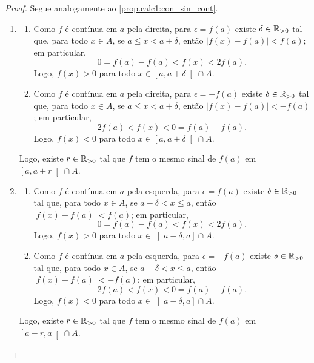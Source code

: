 \begin{proof}
    Segue analogamente ao \cref{prop.calc1:con_sin_cont}.
        \begin{enumerate}[leftmargin=*, align=left, label=\textbf{(\alph*)}]
            \item 
                \begin{enumerate}[label=\roman*.]
                    \item Como $f$ é contínua em $a$ pela direita, para $\epsilon = f(a)$ existe $\delta \in \mathbb{R}_{>0}$ tal que, para todo $x \in A$, se $a \leq x < a+\delta$, então $|f(x) - f(a)| < f(a)$; em particular,
                        \[
                            0 = f(a) - f(a) < f(x) < 2f(a).
                        \]
                    Logo, $f(x) > 0$ para todo $x \in \left[a,a+\delta\right[ \cap A$.
                    \item Como $f$ é contínua em $a$ pela direita, para $\epsilon = -f(a)$ existe $\delta \in \mathbb{R}_{>0}$ tal que, para todo $x \in A$, se $a \leq x < a+\delta$, então $|f(x) - f(a)| < -f(a)$; em particular,
                        \[
                            2f(a) < f(x) < 0 = f(a) - f(a).
                        \]
                    Logo, $f(x) < 0$ para todo $x \in \left[a,a+\delta\right[ \cap A$.
                \end{enumerate}
            Logo, existe $r \in \mathbb{R}_{>0}$ tal que $f$ tem o mesmo sinal de $f(a)$ em $\left[ a, a+r \right[ \cap A$. \blackproof
            \item
                \begin{enumerate}[label=\roman*.]
                    \item Como $f$ é contínua em $a$ pela esquerda, para $\epsilon = f(a)$ existe $\delta \in \mathbb{R}_{>0}$ tal que, para todo $x \in A$, se $a-\delta < x \leq a$, então $|f(x) - f(a)| < f(a)$; em particular,
                        \[
                            0 = f(a) - f(a) < f(x) < 2f(a).
                        \]
                    Logo, $f(x) > 0$ para todo $x \in \left]a-\delta,a\right] \cap A$.
                    \item Como $f$ é contínua em $a$ pela esquerda, para $\epsilon = -f(a)$ existe $\delta \in \mathbb{R}_{>0}$ tal que, para todo $x \in A$, se $a-\delta < x \leq a$, então $|f(x) - f(a)| < -f(a)$; em particular,
                        \[
                            2f(a) < f(x) < 0 = f(a) - f(a).
                        \]
                    Logo, $f(x) < 0$ para todo $x \in \left]a-\delta,a\right] \cap A$.
                \end{enumerate}
            Logo, existe $r \in \mathbb{R}_{>0}$ tal que $f$ tem o mesmo sinal de $f(a)$ em $\left[ a-r, a \right[ \cap A$. \blackproof
        \end{enumerate}
\end{proof}


